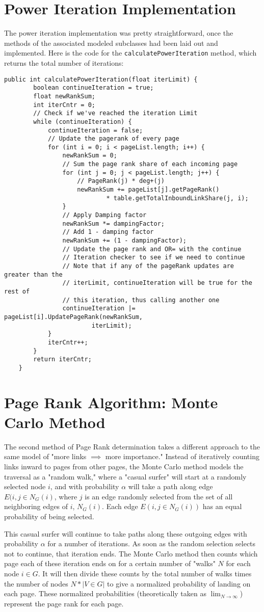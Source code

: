 \documentclass[11pt]{article}
\begin{document}
\section*{Power Iteration Implementation}
The power iteration implementation was pretty straightforward, once the methods of the associated modeled subclasses had been laid out and implemented. Here is the code for the \verb!calculatePowerIteration! method, which returns the total number of iterations:
\begin{lstlisting}
public int calculatePowerIteration(float iterLimit) {
		boolean continueIteration = true;
		float newRankSum;
		int iterCntr = 0;
		// Check if we've reached the iteration Limit
		while (continueIteration) {
			continueIteration = false;
			// Update the pagerank of every page
			for (int i = 0; i < pageList.length; i++) {
				newRankSum = 0;
				// Sum the page rank share of each incoming page
				for (int j = 0; j < pageList.length; j++) {
					// PageRank(j) * deg+(j)
					newRankSum += pageList[j].getPageRank()
							* table.getTotalInboundLinkShare(j, i);
				}
				// Apply Damping factor
				newRankSum *= dampingFactor;
				// Add 1 - damping factor
				newRankSum += (1 - dampingFactor);
				// Update the page rank and OR= with the continue
				// Iteration checker to see if we need to continue
				// Note that if any of the pageRank updates are greater than the
				// iterLimit, continueIteration will be true for the rest of
				// this iteration, thus calling another one
				continueIteration |= pageList[i].UpdatePageRank(newRankSum,
						iterLimit);
			}
			iterCntr++;
		}
		return iterCntr;
	}
\end{lstlisting}

\section*{Page Rank Algorithm: Monte Carlo Method}
\label{sec:monte}
The second method of Page Rank determination takes a different approach to the same model of "more links $\implies$ more importance." Instead of iteratively counting links inward to pages from other pages, the Monte Carlo method models the traversal as a "random walk," where a "casual surfer" will start at a randomly selected node $i$, and with probability $\alpha$ will take a path along edge $E(i,j\in N_G(i)$, where $j$ is an edge randomly selected from the set of all neighboring edges of $i$, $N_G(i)$. Each edge $E(i,j\in N_G(i))$ has an equal probability of being selected.

This casual surfer will continue to take paths along these outgoing edges with probability $\alpha$ for a number of iterations. As soon as the random selection selects not to continue, that iteration ends. The Monte Carlo method then counts which page each of these iteration ends on for a certain number of "walks" $N$ for each node $i\in G$. It will then divide these counts by the total number of walks times the number of nodes $N * |V \in G|$ to give a normalized probability of landing on each page. These normalized probabilities (theoretically taken as $\lim_{N \to \infty}$) represent the page rank for each page.
\end{document}
